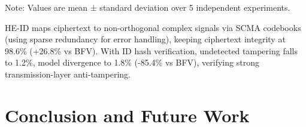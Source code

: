 \documentclass[runningheads]{llncs}
\begin{document}
\begin{table}[!h]
\centering
\caption{Model Inversion Attack Performance }
\label{tab:model_inversion_perf}
\renewcommand{\arraystretch}{1.2} %
\vspace{1mm}
\footnotesize{Note: Values are mean ± standard deviation over 5 independent experiments.}
\end{table}
HE-ID maps ciphertext to non-orthogonal complex signals via SCMA codebooks (using sparse redundancy for error handling), keeping ciphertext integrity at 98.6\% (+26.8\% vs BFV). With ID hash verification, undetected tampering falls to 1.2\%, model divergence to 1.8\% (-85.4\% vs BFV), verifying strong transmission-layer anti-tampering.
\section{Conclusion and Future Work}
\end{document}
